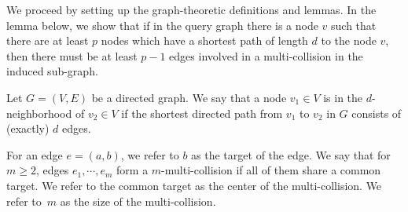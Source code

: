 We proceed by setting up the graph-theoretic definitions and lemmas. In the lemma below, we show that if in the query graph there is a node $v$ such that there are at least $p$ nodes which have a shortest path of length $d$ to the node $v$, then there must be at least $p-1$ edges involved in a multi-collision in the induced sub-graph.
\begin{definition} Let $G=(V,E)$ be  a directed graph. We say that a node $v_1\in V$ is in the $d$-neighborhood of $v_2\in V$ if the shortest directed path from $v_1$ to $v_2$ in $G$ consists of (exactly) $d$ edges.
\end{definition}

\begin{definition} 
For an edge $e=(a,b)$, we refer to $b$ as the target of the edge.
We say that for $m\geq 2$, edges $e_1,\cdots,e_m$ form a $m$-multi-collision if all of them share a common target. We refer to the common target as the center of the multi-collision. We refer to~$m$ as the size of the multi-collision.
\end{definition}


